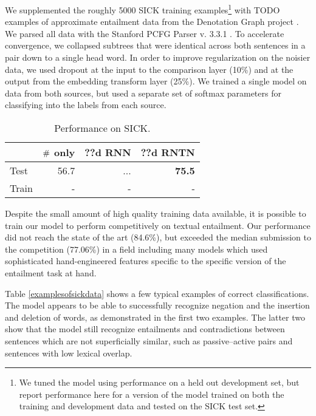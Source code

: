We supplemented the roughly 5000 SICK training examples\footnote{We tuned the model using performance on a held out development set, but report performance here for a version of the model trained on both the training and development data and tested on the SICK test set.} with TODO examples of approximate entailment data from the Denotation Graph project \cite{hodoshimage}. We parsed all data with the Stanford PCFG Parser v. 3.3.1 \cite{klein2003accurate}. To accelerate convergence, we collapsed subtrees that were identical across both sentences in a pair down to a single head word. In order to improve regularization on the noisier data, we used dropout \cite{hinton2012improving} at the input to the comparison layer (10\%) and at the output from the embedding transform layer (25\%). We trained a single model on data from both sources, but used a separate set of softmax parameters for classifying into the labels from each source.

\begin{table}[tp]
  \centering \small
  \begin{tabular}{ l r@{ \ } r@{ \ } r@{ \ } }
    \toprule
    ~&\multicolumn{1}{c}{$\mathbin{\#}$ only} & \multicolumn{1}{c}{??d RNN}  & \multicolumn{1}{c}{??d RNTN}\\
    \midrule
    Test & 56.7 &	...& \textbf{75.5} \\
    Train &- &- &-  \\
    \bottomrule
  \end{tabular}
  \caption{Performance on SICK.}
  \label{sresultstable}
\end{table} 

Despite the small amount of high quality training data available, it is possible to train our model to perform competitively on textual entailment. Our performance did not reach the state of the art (84.6\%), but exceeded the median submission to the competition (77.06\%) in a field including many models which used sophisticated hand-engineered features specific to the specific version of the entailment task at hand.

Table \ref{examplesofsickdata} shows a few typical examples of correct classifications. The model appears to be able to successfully recognize negation and the insertion and deletion of words, as demonstrated in the first two examples. The latter two show that the model still recognize entailments and contradictions between sentences which are not superficially similar, such as passive--active pairs and sentences with low lexical overlap.